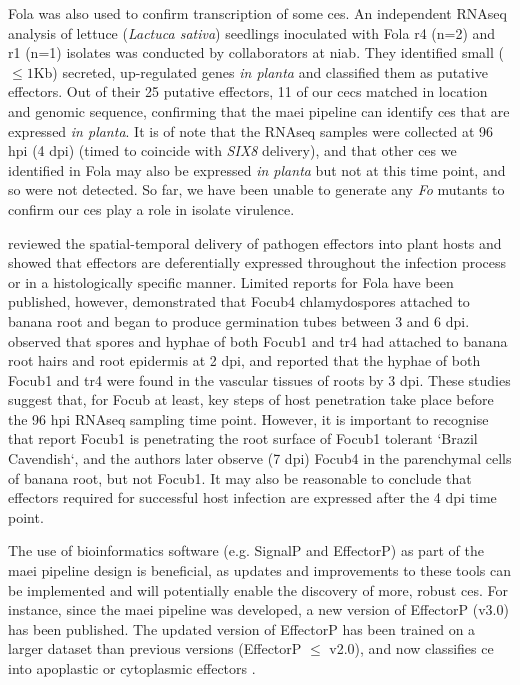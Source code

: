 \ac{Fola} was also used to confirm transcription of some \acp{ce}. An independent RNAseq analysis of lettuce (\textit{Lactuca sativa}) seedlings inoculated with \ac{Fola} \ac{r4} (n=2) and \ac{r1} (n=1) isolates was conducted by collaborators at \ac{niab}. They identified small ($\le1$Kb) secreted, up-regulated genes \textit{in planta} and classified them as putative effectors. Out of their 25 putative effectors, 11 of our \acp{cec} matched in location and genomic sequence, confirming that the \ac{maei} pipeline can identify \acp{ce} that are expressed \textit{in planta}. It is of note that the RNAseq samples were collected at 96 \ac{hpi} (4 \ac{dpi}) (timed to coincide with \textit{SIX8} delivery), and that other \acp{ce} we identified in \ac{Fola} may also be expressed \textit{in planta} but not at this time point, and so were not detected. So far, we have been unable to generate any \textit{Fo} mutants to confirm our \acp{ce} play a role in isolate virulence. 

\textcite{Toruno2016} reviewed the spatial-temporal delivery of pathogen effectors into plant hosts and showed that effectors are deferentially expressed throughout the infection process or in a histologically specific manner. Limited reports for \ac{Fola} have been published, however, \textcite{Li2011} demonstrated that \ac{Focub4} chlamydospores attached to banana root and began to produce germination tubes between 3 and 6 \ac{dpi}. \textcite{Li2017} observed that spores and hyphae of both \ac{Focub1} and \ac{tr4} had attached to banana root hairs and root epidermis at 2 \ac{dpi}, and reported that the hyphae of both \ac{Focub1} and \ac{tr4} were found in the vascular tissues of roots by 3 \ac{dpi}. These studies suggest that, for \ac{Focub} at least, key steps of host penetration take place before the 96 \ac{hpi} RNAseq sampling time point. However, it is important to recognise that \textcite{Li2017} report \ac{Focub1} is penetrating the root surface of \ac{Focub1} tolerant `Brazil Cavendish`, and the authors later observe (7 \ac{dpi})  \ac{Focub4} in the parenchymal cells of banana root, but not \ac{Focub1}. It may also be reasonable to conclude that effectors required for successful host infection are expressed after the 4 \ac{dpi} time point.  


The use of bioinformatics software (e.g. SignalP and EffectorP) as part of the \ac{maei} pipeline design is beneficial, as updates and improvements to these tools can be implemented and will potentially enable the discovery of more, robust \acp{ce}. For instance, since the \ac{maei} pipeline was developed, a new version of EffectorP (v3.0) has been published. The updated version of EffectorP has been trained on a larger dataset than previous versions (EffectorP $\le$ v2.0), and now classifies \acl{ce} into apoplastic or cytoplasmic effectors \parencite{Sperschneider2022}.  

